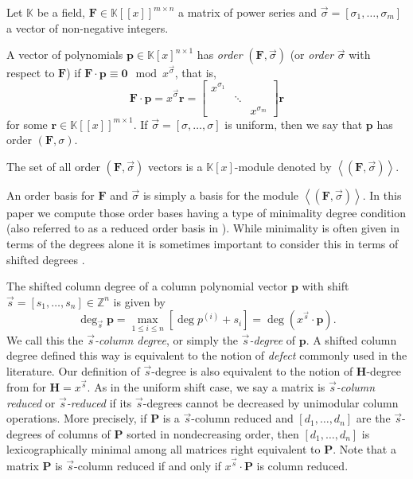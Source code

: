 Let $\mathbb{K}$ be a field, $\mathbf{F}\in\mathbb{K}\left[\left[x\right]\right]^{m\times n}$
a matrix of power series and $\vec{\sigma}=\left[\sigma_{1},\dots,\sigma_{m}\right]$
a vector of non-negative integers. 
\begin{defn}
A vector of polynomials $\mathbf{p}\in\mathbb{K}\left[x\right]^{n\times1}$
has \emph{order} $\left(\mathbf{F},\vec{\sigma}\right)$ (or \emph{order}
$\vec{\sigma}$ with respect to $\mathbf{F}$) if $\mathbf{F}\cdot\mathbf{p}\equiv\mathbf{0}\mod x^{\vec{\sigma}}$,
that is, 
\[
\mathbf{F}\cdot\mathbf{p}=x^{\vec{\sigma}}\mathbf{r}=\begin{bmatrix}x^{\sigma_{1}}\\
 & \ddots\\
 &  & x^{\sigma_{m}}
\end{bmatrix}\mathbf{r}
\]
 for some $\mathbf{r}\in\mathbb{K}\left[\left[x\right]\right]^{m\times1}$.
If $\vec{\sigma}=\left[\sigma,\dots,\sigma\right]$ is uniform, then
we say that $\mathbf{p}$ has order $\left(\mathbf{F},\sigma\right).$
\begin{comment}
The vector of power series $\mathbf{r}$ is called the order $\left(\mathbf{F},\sigma\right)$-residual
of \textbf{$\mathbf{p}$}. 
\end{comment}
{} The set of all order $\left(\mathbf{F},\vec{\sigma}\right)$ vectors
is a $\mathbb{K}\left[x\right]$-module denoted by $\left\langle \left(\mathbf{F},\vec{\sigma}\right)\right\rangle $. 
\end{defn}
An order basis for $\mathbf{F}$ and $\vec{\sigma}$ is simply a basis
for the module $\left\langle \left(\mathbf{F},\vec{\sigma}\right)\right\rangle $.
In this paper we compute those order bases having a type of minimality
degree condition (also referred to as a reduced order basis in \citep{BL1997}).
While minimality is often given in terms of the degrees alone it is
sometimes important to consider this in terms of shifted degrees \citep{BLV:jsc06}.

The shifted column degree of a column polynomial vector $\mathbf{p}$
with shift $\vec{s}=\left[s_{1},\dots,s_{n}\right]\in\mathbb{Z}^{n}$
is given by 
\[
\deg_{\vec{s}}\mathbf{p}=\max_{1\le i\le n}[\deg p^{\left(i\right)}+s_{i}]=\deg(x^{\vec{s}}\cdot\mathbf{p}).
\]
 We call this the \emph{$\vec{s}$-column degree}, or simply the \emph{$\vec{s}$-degree}
of $\mathbf{p}$. A shifted column degree defined this way is equivalent
to the notion of \emph{defect} commonly used in the literature. Our
definition of $\vec{s}$-degree is also equivalent to the notion of
$\mathbf{H}$-degree from \citep{BL1997} for $\mathbf{H}=x^{\vec{s}}$.
As in the uniform shift case, we say a matrix is \emph{$\vec{s}$-column
reduced} or \emph{$\vec{s}$-reduced} if its $\vec{s}$-degrees cannot
be decreased by unimodular column operations. More precisely, if $\mathbf{P}$
is a $\vec{s}$-column reduced and $[d_{1},\dots,d_{n}]$ are the
$\vec{s}$-degrees of columns of $\mathbf{P}$ sorted in nondecreasing
order, then $[d_{1},\dots,d_{n}]$ is lexicographically minimal among
all matrices right equivalent to $\mathbf{P}$. Note that a matrix
$\mathbf{P}$ is $\vec{s}$-column reduced if and only if $x^{\vec{s}}\cdot\mathbf{P}$
is column reduced\citep{BLV:1999,BLV:jsc06}. 

